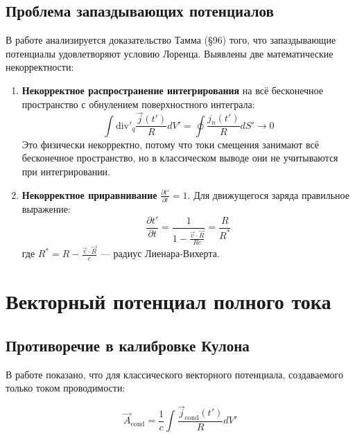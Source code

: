 \documentclass[12pt, a4paper]{article}
\begin{document}
\subsection{Проблема запаздывающих потенциалов}

В работе \cite{LaggingPotentials} анализируется доказательство Тамма (§96) того, что запаздывающие потенциалы удовлетворяют условию Лоренца. Выявлены две математические некорректности:

\begin{enumerate}
    \item \textbf{Некорректное распространение интегрирования} на всё бесконечное пространство с обнулением поверхностного интеграла:
    \begin{equation}
    \int \text{div}'_q \frac{\vec{j}(t')}{R} dV' = \oint \frac{j_n(t')}{R} dS' \longrightarrow 0
    \label{eq:gauss_error}
    \end{equation}
    Это физически некорректно, потому что токи смещения занимают всё бесконечное пространство, но в классическом выводе они не учитываются при интегрировании.

    \item \textbf{Некорректное приравнивание} $\frac{\partial t'}{\partial t} = 1$. Для движущегося заряда правильное выражение:
    \begin{equation}
    \frac{\partial t'}{\partial t} = \frac{1}{1 - \frac{\vec{v} \cdot \vec{R}}{Rc}} = \frac{R}{R^*}
    \label{eq:retarded_time}
    \end{equation}
    где $R^* = R - \frac{\vec{v} \cdot \vec{R}}{c}$ --- радиус Лиенара-Вихерта.
\end{enumerate}

\section{Векторный потенциал полного тока}

\subsection{Противоречие в калибровке Кулона}

В работе \cite{CoulombCalib} показано, что для классического векторного потенциала, создаваемого только током проводимости:

\begin{equation}
\vec{A}_{\text{cond}} = \frac{1}{c} \int \frac{\vec{j}_{\text{cond}}(t')}{R} dV'
\label{eq:vector_potential_cond}
\end{equation}
\end{document}
